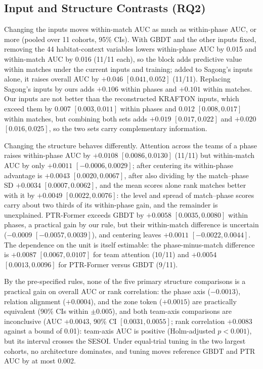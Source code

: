 \documentclass[sigconf,anonymous]{acmart}
\begin{document}
\subsection{Input and Structure Contrasts (RQ2)}
\label{sec:results:inputs}
Changing the inputs moves within-match AUC as much as within-phase AUC, or more (pooled over 11 cohorts, 95\% CIs). With GBDT and the other inputs fixed, removing the 44 habitat-context variables lowers within-phase AUC by 0.015 and within-match AUC by 0.016 (11/11 each), so the block adds predictive value within matches under the current inputs and training; added to Sagong's inputs alone, it raises overall AUC by $+0.046$ $[0.041,\allowbreak 0.052]$ (11/11). Replacing Sagong's inputs by ours adds $+0.106$ within phases and $+0.101$ within matches. Our inputs are not better than the reconstructed KRAFTON inputs, which exceed them by 0.007 $[0.003,\allowbreak 0.011]$ within phases and 0.012 $[0.008,\allowbreak 0.017]$ within matches, but combining both sets adds $+0.019$ $[0.017,\allowbreak 0.022]$ and $+0.020$ $[0.016,\allowbreak 0.025]$, so the two sets carry complementary information.

Changing the structure behaves differently. Attention across the teams of a phase raises within-phase AUC by $+0.0108$ $[0.0086,\allowbreak 0.0130]$ (11/11) but within-match AUC by only $+0.0011$ $[-0.0006,\allowbreak 0.0029]$; after centering its within-phase advantage is $+0.0043$ $[0.0020,\allowbreak 0.0067]$, after also dividing by the match--phase SD $+0.0034$ $[0.0007,\allowbreak 0.0062]$, and the mean scores alone rank matches better with it by $+0.0049$ $[0.0022,\allowbreak 0.0076]$: the level and spread of match--phase scores carry about two thirds of its within-phase gain, and the remainder is unexplained. PTR-Former exceeds GBDT by $+0.0058$ $[0.0035,\allowbreak 0.0080]$ within phases, a practical gain by our rule, but their within-match difference is uncertain ($-0.0009$ $[-0.0057,\allowbreak 0.0039]$), and centering leaves $+0.0011$ $[-0.0022,\allowbreak 0.0044]$. The dependence on the unit is itself estimable: the phase-minus-match difference is $+0.0087$ $[0.0067,\allowbreak 0.0107]$ for team attention (10/11) and $+0.0054$ $[0.0013,\allowbreak 0.0096]$ for PTR-Former versus GBDT (9/11).

By the pre-specified rules, none of the five primary structure comparisons is a practical gain on overall AUC or rank correlation: the phase axis ($-0.0013$), relation alignment ($+0.0004$), and the zone token ($+0.0015$) are practically equivalent (90\% CIs within $\pm0.005$), and both team-axis comparisons are inconclusive (AUC $+0.0043$, 90\% CI $[0.0031,\allowbreak 0.0055]$; rank correlation $+0.0083$ against a bound of 0.01): team-axis AUC is positive (Holm-adjusted $p<0.001$), but its interval crosses the SESOI. Under equal-trial tuning in the two largest cohorts, no architecture dominates, and tuning moves reference GBDT and PTR AUC by at most 0.002.
\end{document}

